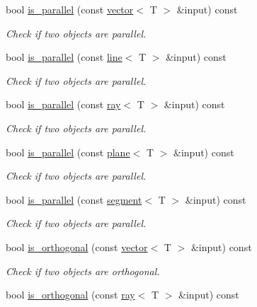 \begin{DoxyCompactItemize}
bool \hyperlink{classddd_1_1vector_ac3fc063a06940c9893579b1f53f1dda0}{is\+\_\+parallel} (const \hyperlink{classddd_1_1vector}{vector}$<$ T $>$ \&input) const
\begin{DoxyCompactList}\small\item\em Check if two objects are parallel. \end{DoxyCompactList}\item 
bool \hyperlink{classddd_1_1vector_a9a7893c62abf786830e4809af056c041}{is\+\_\+parallel} (const \hyperlink{classddd_1_1line}{line}$<$ T $>$ \&input) const
\begin{DoxyCompactList}\small\item\em Check if two objects are parallel. \end{DoxyCompactList}\item 
bool \hyperlink{classddd_1_1vector_a7557630d95edffd87fd4ddf15aecf460}{is\+\_\+parallel} (const \hyperlink{classddd_1_1ray}{ray}$<$ T $>$ \&input) const
\begin{DoxyCompactList}\small\item\em Check if two objects are parallel. \end{DoxyCompactList}\item 
bool \hyperlink{classddd_1_1vector_adf222e3911725f43cfd74418bb4ebb87}{is\+\_\+parallel} (const \hyperlink{classddd_1_1plane}{plane}$<$ T $>$ \&input) const
\begin{DoxyCompactList}\small\item\em Check if two objects are parallel. \end{DoxyCompactList}\item 
bool \hyperlink{classddd_1_1vector_adbf47c4d77ce304c3ac47badc366c2c2}{is\+\_\+parallel} (const \hyperlink{classddd_1_1segment}{segment}$<$ T $>$ \&input) const
\begin{DoxyCompactList}\small\item\em Check if two objects are parallel. \end{DoxyCompactList}\item 
bool \hyperlink{classddd_1_1vector_aa4093c63121a3787e4b43581f23c3e0a}{is\+\_\+orthogonal} (const \hyperlink{classddd_1_1vector}{vector}$<$ T $>$ \&input) const
\begin{DoxyCompactList}\small\item\em Check if two objects are orthogonal. \end{DoxyCompactList}\item 
bool \hyperlink{classddd_1_1vector_a318668b4cf5fab06176119fbe4655b39}{is\+\_\+orthogonal} (const \hyperlink{classddd_1_1ray}{ray}$<$ T $>$ \&input) const

\end{DoxyCompactItemize}
